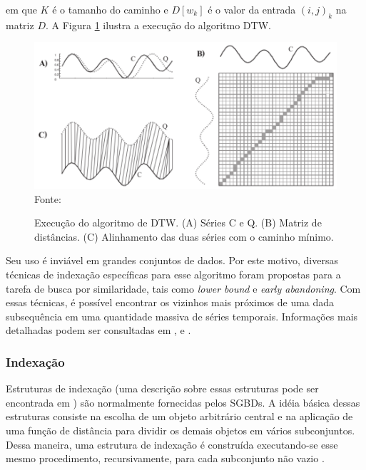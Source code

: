 em que \({K}\) é o tamanho do caminho e \({D[w_{k}]}\) é o valor da entrada \({(i,j)_{k}}\) na matriz \({D}\). A Figura \ref{fig:dtw} ilustra a execução do algoritmo DTW.

\begin{figure}[!htb]
   \centering
   \caption{Execução do algoritmo de DTW. (A) Séries C e Q. (B) Matriz de distâncias. (C) Alinhamento das duas séries com o caminho mínimo.}\label{fig:dtw} 
   \includegraphics[scale=0.40]{figuras/dtw.png}
   \\Fonte: \cite{keogh2004}
\end{figure}

Seu uso é inviável em grandes conjuntos de dados. Por este motivo, diversas técnicas de indexação específicas para esse algoritmo foram propostas para a tarefa de busca por similaridade, tais como \textit{lower bound} e \textit{early abandoning}. Com essas técnicas, é possível encontrar os vizinhos mais próximos de uma dada subsequência em uma quantidade massiva de séries temporais. Informações mais detalhadas podem ser consultadas em \cite{mizutani2006}, \cite{kruskal1983} e \cite{juang1991}.

\subsubsection{Indexação}\label{subsubsec:indexacao}
Estruturas de indexação (uma descrição sobre essas estruturas pode ser encontrada em \cite{garciaMolina2002}) são normalmente fornecidas pelos SGBDs. A idéia básica dessas estruturas consiste na escolha de um objeto arbitrário central e na aplicação de uma função de distância para dividir os demais objetos em vários subconjuntos. Dessa maneira, uma estrutura de indexação é construída executando-se esse mesmo procedimento, recursivamente, para cada subconjunto não vazio \cite{barioni2006}.

